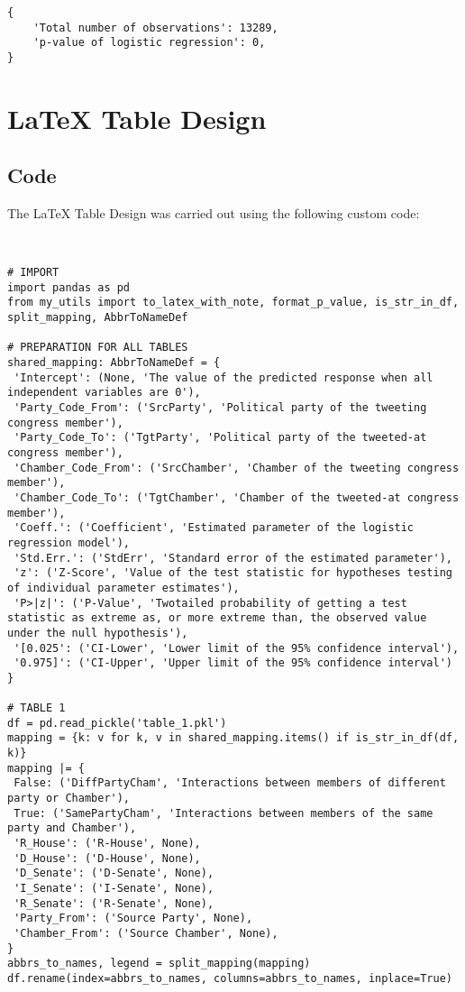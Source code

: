 \documentclass[11pt]{article}
\begin{document}
\begin{Verbatim}[tabsize=4]
{
    'Total number of observations': 13289,
    'p-value of logistic regression': 0,
}
\end{Verbatim}

\section{LaTeX Table Design}
\subsection{{Code}}
The LaTeX Table Design was carried out using the following custom code:

\begin{verbatim}


# IMPORT
import pandas as pd
from my_utils import to_latex_with_note, format_p_value, is_str_in_df, split_mapping, AbbrToNameDef

# PREPARATION FOR ALL TABLES
shared_mapping: AbbrToNameDef = {
 'Intercept': (None, 'The value of the predicted response when all independent variables are 0'),
 'Party_Code_From': ('SrcParty', 'Political party of the tweeting congress member'),
 'Party_Code_To': ('TgtParty', 'Political party of the tweeted-at congress member'),
 'Chamber_Code_From': ('SrcChamber', 'Chamber of the tweeting congress member'),
 'Chamber_Code_To': ('TgtChamber', 'Chamber of the tweeted-at congress member'),
 'Coeff.': ('Coefficient', 'Estimated parameter of the logistic regression model'),
 'Std.Err.': ('StdErr', 'Standard error of the estimated parameter'),
 'z': ('Z-Score', 'Value of the test statistic for hypotheses testing of individual parameter estimates'),
 'P>|z|': ('P-Value', 'Twotailed probability of getting a test statistic as extreme as, or more extreme than, the observed value under the null hypothesis'),
 '[0.025': ('CI-Lower', 'Lower limit of the 95% confidence interval'),
 '0.975]': ('CI-Upper', 'Upper limit of the 95% confidence interval')
}

# TABLE 1
df = pd.read_pickle('table_1.pkl')
mapping = {k: v for k, v in shared_mapping.items() if is_str_in_df(df, k)} 
mapping |= {
 False: ('DiffPartyCham', 'Interactions between members of different party or Chamber'),
 True: ('SamePartyCham', 'Interactions between members of the same party and Chamber'),
 'R_House': ('R-House', None),
 'D_House': ('D-House', None),
 'D_Senate': ('D-Senate', None),
 'I_Senate': ('I-Senate', None),
 'R_Senate': ('R-Senate', None),
 'Party_From': ('Source Party', None),
 'Chamber_From': ('Source Chamber', None),
}
abbrs_to_names, legend = split_mapping(mapping)
df.rename(index=abbrs_to_names, columns=abbrs_to_names, inplace=True)


\end{verbatim}
\end{document}
